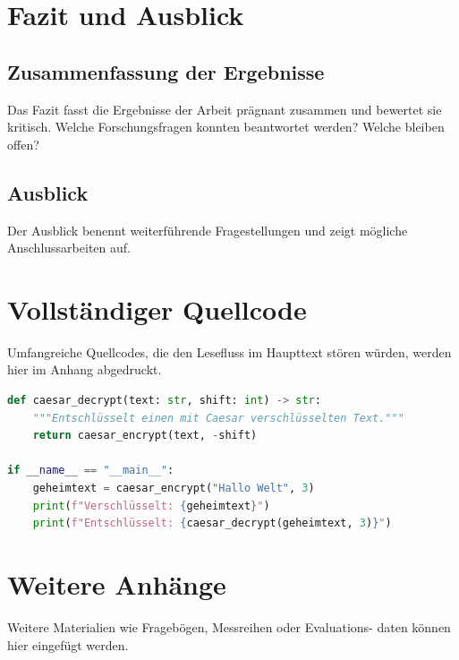 \documentclass[
  12pt,       %
  a4paper,    %
  twoside,    %
  openright,  %
]{book}
\begin{document}
\chapter{Fazit und Ausblick}
\label{ch:fazit}

\section{Zusammenfassung der Ergebnisse}

Das Fazit fasst die Ergebnisse der Arbeit prägnant zusammen und
bewertet sie kritisch. Welche Forschungsfragen konnten beantwortet
werden? Welche bleiben offen?

\section{Ausblick}

Der Ausblick benennt weiterführende Fragestellungen und zeigt
mögliche Anschlussarbeiten auf.

\begin{appendices}

\chapter{Vollständiger Quellcode}
\label{app:code}

Umfangreiche Quellcodes, die den Lesefluss im Haupttext stören
würden, werden hier im Anhang abgedruckt.

\begin{lstlisting}[language=Python,
                   caption={Erweitertes Verschlüsselungsbeispiel},
                   label={lst:erweiterung}]
def caesar_decrypt(text: str, shift: int) -> str:
    """Entschlüsselt einen mit Caesar verschlüsselten Text."""
    return caesar_encrypt(text, -shift)

if __name__ == "__main__":
    geheimtext = caesar_encrypt("Hallo Welt", 3)
    print(f"Verschlüsselt: {geheimtext}")
    print(f"Entschlüsselt: {caesar_decrypt(geheimtext, 3)}")
\end{lstlisting}

\chapter{Weitere Anhänge}
\label{app:b}

Weitere Materialien wie Fragebögen, Messreihen oder Evaluations-
daten können hier eingefügt werden.

\end{appendices}

\backmatter

\printbibliography[heading=bibintoc]
\end{document}
